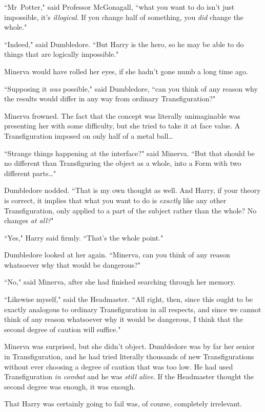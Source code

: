 ``Mr~Potter," said Professor McGonagall, ``what you want to do isn't just impossible, it's \emph{illogical}. If you change half of something, you \emph{did} change the whole."

``Indeed," said Dumbledore. ``But Harry is the hero, so he may be able to do things that are logically impossible."

Minerva would have rolled her eyes, if she hadn't gone numb a long time ago.

``Supposing it \emph{was} possible," said Dumbledore, ``can you think of any reason why the results would differ in any way from ordinary Transfiguration?"

Minerva frowned. The fact that the concept was literally unimaginable was presenting her with some difficulty, but she tried to take it at face value. A Transfiguration imposed on only half of a metal ball{\ldots}

``Strange things happening at the interface?" said Minerva. ``But that should be no different than Transfiguring the object as a whole, into a Form with two different parts{\ldots}"

Dumbledore nodded. ``That is my own thought as well. And Harry, if your theory is correct, it implies that what you want to do is \emph{exactly} like any other Transfiguration, only applied to a part of the subject rather than the whole? No changes \emph{at all?}"

``Yes," Harry said firmly. ``That's the whole point."

Dumbledore looked at her again. ``Minerva, can you think of any reason whatsoever why that would be dangerous?"

``No," said Minerva, after she had finished searching through her memory.

``Likewise myself," said the Headmaster. ``All right, then, since this ought to be exactly analogous to ordinary Transfiguration in all respects, and since we cannot think of any reason whatsoever why it would be dangerous, I think that the second degree of caution will suffice."

Minerva was surprised, but she didn't object. Dumbledore was by far her senior in Transfiguration, and he had tried literally thousands of new Transfigurations without ever choosing a degree of caution that was too low. He had used Transfiguration \emph{in combat} and he was \emph{still alive}. If the Headmaster thought the second degree was enough, it was enough.

That Harry was certainly going to fail was, of course, completely irrelevant.

